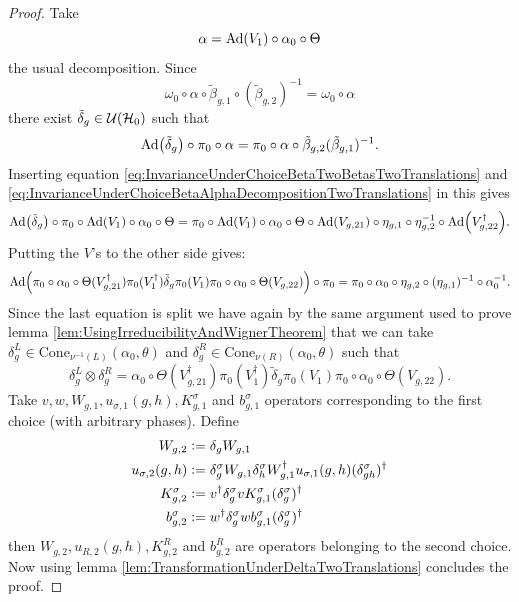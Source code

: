 \documentclass[12pt,a4paper,twoside]{article}
\numberwithin{equation}{section}
\begin{document}
\begin{proof}
		Take 
	\begin{equation}\label{eq:InvarianceUnderChoiceBetaAlphaDecompositionTwoTranslations}
		\alpha=\Ad{V_1}\circ\alpha_{0}\circ\Theta
	\end{equation}
	the usual decomposition. Since
	\begin{equation}
		\omega_0\circ\alpha\circ\tilde{\beta}_{g,1}\circ(\tilde{\beta}_{g,2})^{-1}=\omega_0\circ\alpha
	\end{equation}
	there exist $\tilde{\delta}_g\in\mathcal U(\mathcal H_0)$ such that
	\begin{equation}
		\Ad{\tilde{\delta}_g}\circ\pi_0\circ\alpha=\pi_0\circ\alpha\circ\tilde{\beta}_{g,2}(\tilde{\beta}_{g,1})^{-1}.
	\end{equation}
	Inserting equation \eqref{eq:InvarianceUnderChoiceBetaTwoBetasTwoTranslations} and \eqref{eq:InvarianceUnderChoiceBetaAlphaDecompositionTwoTranslations} in this gives
	\begin{equation}
		\Ad{\tilde{\delta}_g}\circ\pi_0\circ\Ad{V_1}\circ\alpha_0\circ\Theta=\pi_0\circ\Ad{V_1}\circ\alpha_0\circ\Theta\circ\Ad{V_{g,21}}\circ\eta_{g,1}\circ\eta_{g,2}^{-1}\circ\Ad{V_{g,22}^\dagger}.
	\end{equation}
	Putting the $V$'s to the other side gives:
	\begin{equation}
		\Ad{\pi_0\circ\alpha_0\circ\Theta(V_{g,21}^\dagger)\pi_0(V_1^\dagger)\tilde{\delta}_g\pi_0(V_1)\pi_0\circ\alpha_0\circ\Theta(V_{g,22})}\circ\pi_0=\pi_0\circ\alpha_0\circ\eta_{g,2}\circ(\eta_{g,1})^{-1}\circ\alpha_0^{-1}.
	\end{equation}
	Since the last equation is split we have again by the same argument used to prove lemma \ref{lem:UsingIrreducibilityAndWignerTheorem} that we can take $\delta_g^L\in\textrm{Cone}_{\nu^{-1}(L)}(\alpha_0,\theta)$ and $\delta_g^R\in\textrm{Cone}_{\nu(R)}(\alpha_0,\theta)$ such that
	\begin{equation}
		\delta_g^L\otimes\delta_g^R=\alpha_0\circ\Theta(V_{g,21}^\dagger)\pi_0(V_1^\dagger)\tilde{\delta}_g\pi_0(V_1)\pi_0\circ\alpha_0\circ\Theta(V_{g,22}).
	\end{equation}
	Take $v,w,W_{g,1},u_{\sigma,1}(g,h),K_{g,1}^\sigma$ and $b_{g,1}^\sigma$ operators corresponding to the first choice (with arbitrary phases). Define
	\begin{align}
		W_{g,2}&\vcentcolon=\delta_g W_{g,1}\\
		u_{\sigma,2}(g,h)&\vcentcolon= \delta_g^\sigma W_{g,1}\delta_h^\sigma W_{g,1}^\dagger u_{\sigma,1}(g,h)(\delta_{gh}^\sigma)^\dagger\\
		K^\sigma_{g,2}&\vcentcolon= v^\dagger \delta_g^\sigma v K_{g,1}^\sigma (\delta_g^\sigma)^\dagger\\
		b_{g,2}^\sigma&\vcentcolon= w^\dagger\delta^\sigma_g w b_{g,1}^\sigma (\delta^\sigma_g)^\dagger
	\end{align}
	then $W_{g,2},u_{R,2}(g,h),K^R_{g,2}$ and $b^R_{g,2}$ are operators belonging to the second choice. Now using lemma \ref{lem:TransformationUnderDeltaTwoTranslations} concludes the proof.
\end{proof}
\end{document}
